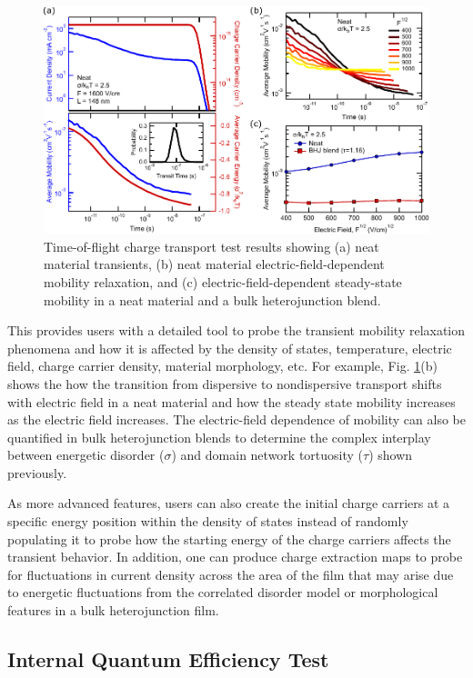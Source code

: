 \documentclass[%
 reprint,onecolumn,notitlepage,
superscriptaddress,longbibliography,
 amsmath,amssymb,
 aps,rmp,floatfix,
]{revtex4-1}
\begin{document}
\begin{figure}[h] %
    \centering
    \includegraphics{ToF_example_data.pdf}
    \caption{Time-of-flight charge transport test results showing (a) neat material transients, (b) neat material electric-field-dependent mobility relaxation, and (c) electric-field-dependent steady-state mobility in a neat material and a bulk heterojunction blend.}
    \label{fig:tof_example}
\end{figure}

This provides users with a detailed tool to probe the transient mobility relaxation phenomena and how it is affected by the density of states, temperature, electric field, charge carrier density, material morphology, etc. 
For example, Fig. \ref{fig:tof_example}(b) shows the how the transition from dispersive to nondispersive transport shifts with electric field in a neat material and how the steady state mobility increases as the electric field increases. 
The electric-field dependence of mobility can also be quantified in bulk heterojunction blends to determine the complex interplay between energetic disorder ($\sigma$) and domain network tortuosity ($\tau$) shown previously.\cite{heiber2017prapp2}

As more advanced features, users can also create the initial charge carriers at a specific energy position within the density of states instead of randomly populating it to probe how the starting energy of the charge carriers affects the transient behavior.
In addition, one can produce charge extraction maps to probe for fluctuations in current density across the area of the film that may arise due to energetic fluctuations from the correlated disorder model or morphological features in a bulk heterojunction film.

\subsection{Internal Quantum Efficiency Test}
\end{document}
